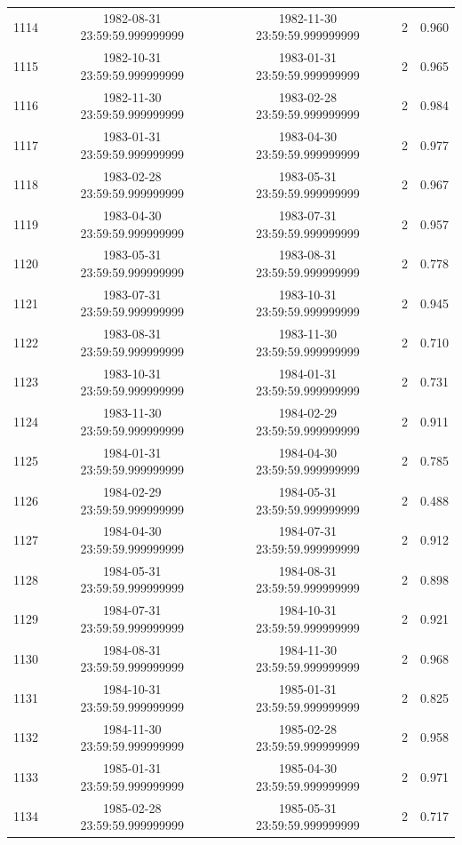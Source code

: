 \begin{table}
\begin{tabular}{lcccc}
1114 & 1982-08-31 23:59:59.999999999 & 1982-11-30 23:59:59.999999999 & 2 & 0.960 \\
1115 & 1982-10-31 23:59:59.999999999 & 1983-01-31 23:59:59.999999999 & 2 & 0.965 \\
1116 & 1982-11-30 23:59:59.999999999 & 1983-02-28 23:59:59.999999999 & 2 & 0.984 \\
1117 & 1983-01-31 23:59:59.999999999 & 1983-04-30 23:59:59.999999999 & 2 & 0.977 \\
1118 & 1983-02-28 23:59:59.999999999 & 1983-05-31 23:59:59.999999999 & 2 & 0.967 \\
1119 & 1983-04-30 23:59:59.999999999 & 1983-07-31 23:59:59.999999999 & 2 & 0.957 \\
1120 & 1983-05-31 23:59:59.999999999 & 1983-08-31 23:59:59.999999999 & 2 & 0.778 \\
1121 & 1983-07-31 23:59:59.999999999 & 1983-10-31 23:59:59.999999999 & 2 & 0.945 \\
1122 & 1983-08-31 23:59:59.999999999 & 1983-11-30 23:59:59.999999999 & 2 & 0.710 \\
1123 & 1983-10-31 23:59:59.999999999 & 1984-01-31 23:59:59.999999999 & 2 & 0.731 \\
1124 & 1983-11-30 23:59:59.999999999 & 1984-02-29 23:59:59.999999999 & 2 & 0.911 \\
1125 & 1984-01-31 23:59:59.999999999 & 1984-04-30 23:59:59.999999999 & 2 & 0.785 \\
1126 & 1984-02-29 23:59:59.999999999 & 1984-05-31 23:59:59.999999999 & 2 & 0.488 \\
1127 & 1984-04-30 23:59:59.999999999 & 1984-07-31 23:59:59.999999999 & 2 & 0.912 \\
1128 & 1984-05-31 23:59:59.999999999 & 1984-08-31 23:59:59.999999999 & 2 & 0.898 \\
1129 & 1984-07-31 23:59:59.999999999 & 1984-10-31 23:59:59.999999999 & 2 & 0.921 \\
1130 & 1984-08-31 23:59:59.999999999 & 1984-11-30 23:59:59.999999999 & 2 & 0.968 \\
1131 & 1984-10-31 23:59:59.999999999 & 1985-01-31 23:59:59.999999999 & 2 & 0.825 \\
1132 & 1984-11-30 23:59:59.999999999 & 1985-02-28 23:59:59.999999999 & 2 & 0.958 \\
1133 & 1985-01-31 23:59:59.999999999 & 1985-04-30 23:59:59.999999999 & 2 & 0.971 \\
1134 & 1985-02-28 23:59:59.999999999 & 1985-05-31 23:59:59.999999999 & 2 & 0.717 \\

\end{tabular}
\end{table}
